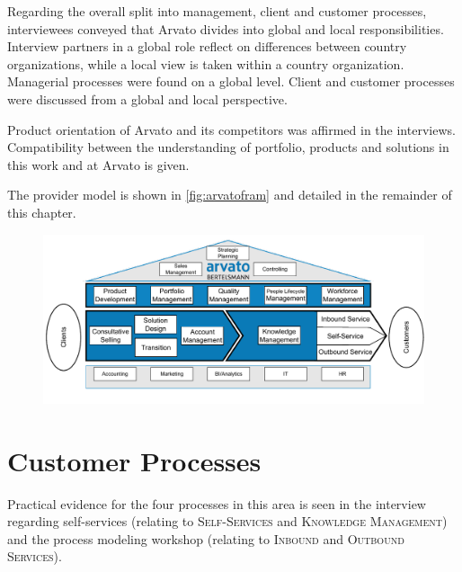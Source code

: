 	Regarding the overall split into management, client and customer processes, interviewees conveyed that Arvato divides into global and local responsibilities.
	Interview partners in a global role reflect on differences between country organizations, while a local view is taken within a country organization. Managerial processes were found on a global level. Client and customer processes were discussed from a global and local perspective. 
	
	Product orientation of Arvato and its competitors was affirmed in the interviews. Compatibility between the understanding of portfolio, products and solutions in this work and at Arvato is given.
	
	 The provider model is shown in \Fig \ref{fig:arvatofram} and detailed in the remainder of this chapter.
	
\begin{figure}[caption={Arvato Framework}, label={fig:arvatofram}]
	{	\includegraphics[width=.98\textwidth]{figures/frameworkA.pdf} 
	}
\end{figure}


	
	\section{Customer Processes}
	
	Practical evidence for the four processes in this area is seen in the interview regarding self-services (relating to \textsc{Self-Services} and \textsc{Knowledge Management}) and the process modeling workshop (relating to \textsc{Inbound} and \textsc{Outbound Services}).
	
